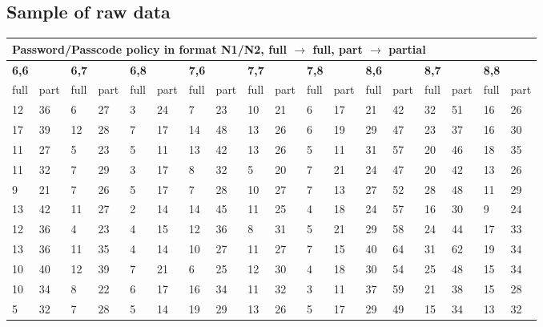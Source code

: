 \documentclass[british,11pt,a4paper]{article}
\begin{document}
\begin{appendices}
	\subsection{Sample of raw data}
	\label{app:raw_data}
	\begin{longtable}{|p{0.5cm}|p{0.5cm}|p{0.5cm}|p{0.5cm}|p{0.5cm}|p{0.5cm}|p{0.5cm}|p{0.5cm}|p{0.5cm}|p{0.5cm}|p{0.5cm}|p{0.5cm}|p{0.5cm}|p{0.5cm}|p{0.5cm}|p{0.5cm}|p{0.5cm}|p{0.5cm}|}
	\hline
	\multicolumn{18}{|l|}{\textbf{Password/Passcode policy in format N1/N2, full $\rightarrow$ full, part $\rightarrow$ partial}} \\ \hline
	\multicolumn{2}{|l|}{\textbf{6,6}} & \multicolumn{2}{l|}{\textbf{6,7}} & \multicolumn{2}{l|}{\textbf{6,8}} & \multicolumn{2}{l|}{\textbf{7,6}} & \multicolumn{2}{l|}{\textbf{7,7}} & \multicolumn{2}{l|}{\textbf{7,8}} & \multicolumn{2}{l|}{\textbf{8,6}} & \multicolumn{2}{l|}{\textbf{8,7}} & \multicolumn{2}{l|}{\textbf{8,8}} \\ \hline
	full & part & full & part & full & part & full & part & full & part & full & part & full & part & full & part & full & part \\ \hline
	12 & 36 & 6 & 27 & 3 & 24 & 7 & 23 & 10 & 21 & 6 & 17 & 21 & 42 & 32 & 51 & 16 & 26 \\ \hline
	17 & 39 & 12 & 28 & 7 & 17 & 14 & 48 & 13 & 26 & 6 & 19 & 29 & 47 & 23 & 37 & 16 & 30 \\ \hline
	11 & 27 & 5 & 23 & 5 & 11 & 13 & 42 & 13 & 26 & 5 & 11 & 31 & 57 & 20 & 46 & 18 & 35 \\ \hline
	11 & 32 & 7 & 29 & 3 & 17 & 8 & 32 & 5 & 20 & 7 & 21 & 24 & 47 & 20 & 42 & 13 & 26 \\ \hline
	9 & 21 & 7 & 26 & 5 & 17 & 7 & 28 & 10 & 27 & 7 & 13 & 27 & 52 & 28 & 48 & 11 & 29 \\ \hline
	13 & 42 & 11 & 27 & 2 & 14 & 14 & 45 & 11 & 25 & 4 & 18 & 24 & 57 & 16 & 30 & 9 & 24 \\ \hline
	12 & 36 & 4 & 23 & 4 & 15 & 12 & 36 & 8 & 31 & 5 & 21 & 29 & 58 & 24 & 44 & 17 & 33 \\ \hline
	13 & 36 & 11 & 35 & 4 & 14 & 10 & 27 & 11 & 27 & 7 & 15 & 40 & 64 & 31 & 62 & 19 & 34 \\ \hline
	10 & 40 & 12 & 39 & 7 & 21 & 6 & 25 & 12 & 30 & 4 & 18 & 30 & 54 & 25 & 48 & 15 & 34 \\ \hline
	10 & 34 & 8 & 22 & 6 & 17 & 16 & 34 & 11 & 32 & 3 & 11 & 37 & 59 & 21 & 38 & 15 & 28 \\ \hline
	5 & 32 & 7 & 28 & 5 & 14 & 19 & 29 & 13 & 26 & 5 & 17 & 29 & 49 & 15 & 34 & 13 & 32 \\ \hline

\end{longtable}
\end{appendices}
\end{document}
